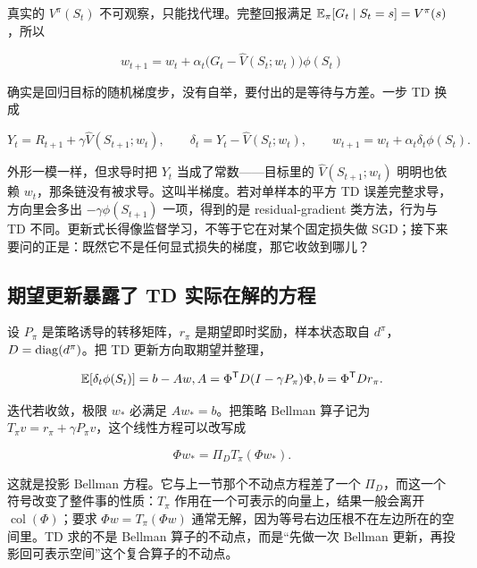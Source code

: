 真实的 \(V^\pi(S_t)\) 不可观察，只能找代理。完整回报满足 \(\mathbb{E}_\pi[G_t\mid S_t=s]=V^\pi(s)\)，所以

\[
w_{t+1}=w_t+\alpha_t\bigl(G_t-\widehat V(S_t;w_t)\bigr)\phi(S_t)
\]

确实是回归目标的随机梯度步，没有自举，要付出的是等待与方差。一步 TD 换成

\[
Y_t=R_{t+1}+\gamma\widehat V(S_{t+1};w_t),
\qquad
\delta_t=Y_t-\widehat V(S_t;w_t),
\qquad
w_{t+1}=w_t+\alpha_t\delta_t\phi(S_t).
\]

外形一模一样，但求导时把 \(Y_t\) 当成了常数——目标里的 \(\widehat V(S_{t+1};w_t)\) 明明也依赖 \(w_t\)，那条链没有被求导。这叫半梯度。若对单样本的平方 TD 误差完整求导，方向里会多出 \(-\gamma\phi(S_{t+1})\) 一项，得到的是 residual-gradient 类方法，行为与 TD 不同。更新式长得像监督学习，不等于它在对某个固定损失做 SGD；接下来要问的正是：既然它不是任何显式损失的梯度，那它收敛到哪儿？

\subsection{期望更新暴露了 TD 实际在解的方程}

设 \(P_\pi\) 是策略诱导的转移矩阵，\(r_\pi\) 是期望即时奖励，样本状态取自 \(d^\pi\)，\(D=\operatorname{diag}(d^\pi)\)。把 TD 更新方向取期望并整理，

\[
\mathbb{E}[\delta_t\phi(S_t)]=b-Aw,
\space
A=\Phi^{\mathsf{T}}D(I-\gamma P_\pi)\Phi,
\space
b=\Phi^{\mathsf{T}}Dr_\pi .
\]

迭代若收敛，极限 \(w_*\) 必满足 \(Aw_*=b\)。把策略 Bellman 算子记为 \(T_\pi v=r_\pi+\gamma P_\pi v\)，这个线性方程可以改写成

\[
\Phi w_*=\Pi_D T_\pi(\Phi w_*).
\]

这就是投影 Bellman 方程。它与上一节那个不动点方程差了一个 \(\Pi_D\)，而这一个符号改变了整件事的性质：\(T_\pi\) 作用在一个可表示的向量上，结果一般会离开 \(\operatorname{col}(\Phi)\)；要求 \(\Phi w=T_\pi(\Phi w)\) 通常无解，因为等号右边压根不在左边所在的空间里。TD 求的不是 Bellman 算子的不动点，而是``先做一次 Bellman 更新，再投影回可表示空间''这个复合算子的不动点。

\begin{center}
\end{center}

